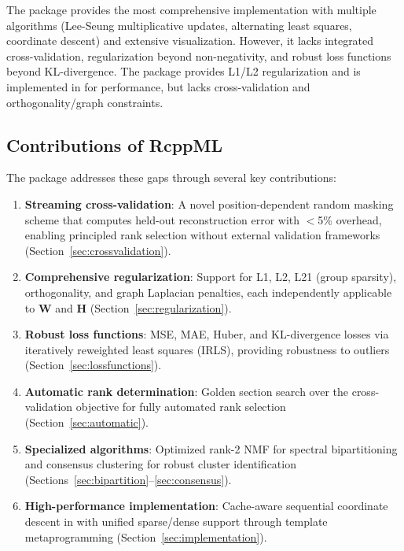 \documentclass[article]{jss_modified}
\begin{document}
The  package \citep{Gaujoux2010} provides the most comprehensive 
implementation with multiple algorithms (Lee-Seung multiplicative updates, 
alternating least squares, coordinate descent) and extensive visualization. 
However, it lacks integrated cross-validation, regularization beyond 
non-negativity, and robust loss functions beyond KL-divergence. The  
package provides L1/L2 regularization and is implemented in  for 
performance, but lacks cross-validation and orthogonality/graph constraints.

\subsection{Contributions of RcppML}

The  package addresses these gaps through several key contributions:

\begin{enumerate}
  \item \textbf{Streaming cross-validation}: A novel position-dependent random 
  masking scheme that computes held-out reconstruction error with $<$5\% overhead, 
  enabling principled rank selection without external validation frameworks 
  (Section~\ref{sec:crossvalidation}).
  
  \item \textbf{Comprehensive regularization}: Support for L1, L2, L21 (group 
  sparsity), orthogonality, and graph Laplacian penalties, each independently 
  applicable to $\mathbf{W}$ and $\mathbf{H}$ (Section~\ref{sec:regularization}).
  
  \item \textbf{Robust loss functions}: MSE, MAE, Huber, and KL-divergence 
  losses via iteratively reweighted least squares (IRLS), providing robustness 
  to outliers (Section~\ref{sec:lossfunctions}).
  
  \item \textbf{Automatic rank determination}: Golden section search over the 
  cross-validation objective for fully automated rank selection 
  (Section~\ref{sec:automatic}).
  
  \item \textbf{Specialized algorithms}: Optimized rank-2 NMF for spectral 
  bipartitioning and consensus clustering for robust cluster identification 
  (Sections~\ref{sec:bipartition}--\ref{sec:consensus}).
  
  \item \textbf{High-performance implementation}: Cache-aware sequential 
  coordinate descent in  with unified sparse/dense support through 
  template metaprogramming (Section~\ref{sec:implementation}).
\end{enumerate}
\end{document}
